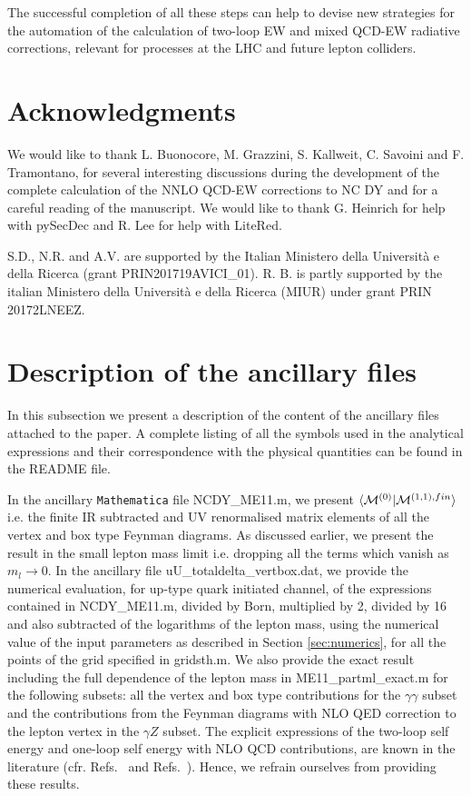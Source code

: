 \documentclass[11pt,a4paper]{article}
\begin{document}
The successful completion of all these steps can help to devise
new strategies for the automation of the calculation of two-loop
EW and mixed QCD-EW radiative corrections,
relevant for processes at the LHC and future lepton colliders.




\section*{Acknowledgments}
We would like to thank L. Buonocore, M. Grazzini, S. Kallweit, C. Savoini and F. Tramontano,
for several interesting discussions during the development of the complete
calculation of the NNLO QCD-EW corrections to NC DY and for a careful reading of the manuscript.
We would like to thank G. Heinrich for help with {\sc pySecDec}
and R. Lee for help with {\sc LiteRed}.

S.D., N.R. and A.V. are supported by the Italian Ministero della Universit\`a e della Ricerca (grant PRIN201719AVICI\_01).
R. B. is partly supported by the italian Ministero della Universit\`a e della Ricerca (MIUR) under grant PRIN 20172LNEEZ.




\appendix
\section{Description of the ancillary files}
\label{app:readme}
In this subsection we present a description of the content of
the ancillary files attached to the paper.
A complete listing of all the symbols used in the analytical expressions
and their correspondence with the physical quantities can be found in the
\textsf{README} file.

In the ancillary {\tt Mathematica} file \textsf{NCDY\_ME11.m},
we present $\langle {\cal M}^{(0)} | {\cal M}^{(1,1),fin} \rangle$ i.e.
the finite IR subtracted and UV renormalised matrix elements of all the vertex
and box type Feynman diagrams.
As discussed earlier, we present the result in the small lepton mass limit
i.e. dropping all the terms which vanish as $m_l \rightarrow 0$.
%
In the ancillary file \textsf{uU\_totaldelta\_vertbox.dat},
we provide the numerical evaluation, for up-type quark initiated channel, of
the expressions contained in \textsf{NCDY\_ME11.m},
divided by Born, multiplied by 2, divided by 16 and also subtracted of the logarithms of the lepton mass,
using the numerical value of the input parameters as described in Section
\ref{sec:numerics},
for all the points of the grid specified in \textsf{gridsth.m}.
%
We also provide the exact result
including the full dependence of the lepton mass
in \textsf{ME11\_partml\_exact.m}
for the following subsets:
all the vertex and box type contributions for the $\gamma \gamma$ subset
and the contributions from the Feynman diagrams
with NLO QED correction to the lepton vertex in the $\gamma Z$ subset.
%
The explicit expressions
of the two-loop self energy and one-loop self energy with NLO QCD contributions,
are known in the literature (cfr. Refs.~\cite{Dittmaier:2020vra} and Refs.~\cite{Denner:1991kt}).
Hence, we refrain ourselves from providing these results.
\end{document}
